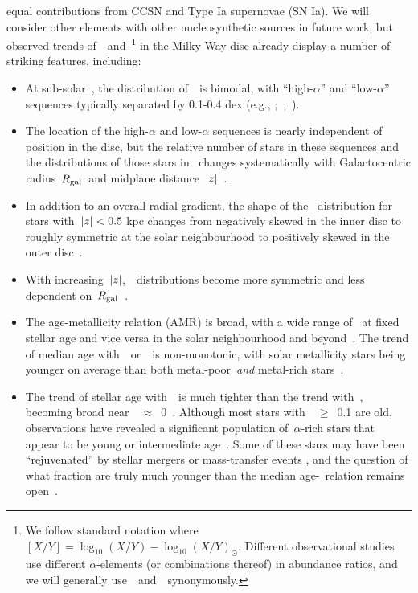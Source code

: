 equal contributions from CCSN and Type Ia supernovae (SN Ia). We will consider 
other elements with other nucleosynthetic sources in future work, but 
observed trends of~\feh~and~\afe\footnote{
	We follow standard notation where $[X/Y] = \log_{10}(X/Y) - 
	\log_{10}(X/Y)_\odot$. Different observational studies use different 
	$\alpha$-elements (or combinations thereof) in abundance ratios, and we 
	will generally use~\ofe~and~\afe~synonymously. 
} in the Milky Way disc already display a number of striking features, 
including: 
\begin{itemize} 
	\item At sub-solar~\feh, the distribution of~\afe~is bimodal, with 
	``high-$\alpha$'' and ``low-$\alpha$'' sequences typically separated by 
	0.1-0.4 dex (e.g., 
	\citealp{Fuhrmann1998};~\citealp*{Bensby2003};~\citealp{Adibekyan2012, 
	Vincenzo2021a}). 

	\item The location of the high-$\alpha$ and low-$\alpha$ sequences is 
	nearly independent of position in the disc, but the relative number of 
	stars in these sequences and the distributions of those stars in 
    \feh~changes systematically with Galactocentric radius~$R_\text{gal}$~and midplane 
	distance~$\left|z\right|$~\citep{Nidever2014, Hayden2015, Weinberg2019}. 

	\item In addition to an overall radial gradient, the shape of the 
	\feh~distribution for stars with~$\left|z\right| < 0.5$ kpc changes from negatively 
	skewed in the inner disc to roughly symmetric at the solar neighbourhood 
	to positively skewed in the outer disc~\citep{Hayden2015, Weinberg2019}. 

	\item With increasing~$\left|z\right|$,~\feh~distributions become more symmetric 
	and less dependent on~$R_\text{gal}$~\citep{Hayden2015}. 

	\item The age-metallicity relation (AMR) is broad, with a wide range of 
	\feh~at fixed stellar age and vice versa in the solar neighbourhood 
	\citep{Edvardsson1993} and beyond~\citep{Feuillet2019}. The trend of 
	median age with~\feh~or~\oh~is non-monotonic, with solar metallicity 
	stars being younger on average than both metal-poor~\textit{and} 
	metal-rich stars~\citep{Feuillet2018, Feuillet2019, Lu2022}. 

	\item The trend of stellar age with~\afe~is much tighter than the trend 
	with~\feh, becoming broad near~\afe~$\approx$~0~\citep{Feuillet2018, 
	Feuillet2019}. Although most stars with~\afe~$\geq$~0.1 are old, 
	observations have revealed a significant population of~$\alpha$-rich stars 
	that appear to be young or intermediate age~\citep{Chiappini2015, 
	Martig2015, Martig2016, Warfield2021}. Some of these stars may have been 
	``rejuvenated'' by stellar mergers or mass-transfer events 
	\citep{Jofre2016, Yong2016, Izzard2018, SilvaAguirre2018}, and 
	the question of what fraction are truly much younger than the median 
	age-\afe~relation remains open~\citep{Hekker2019, Miglio2021}. 
\end{itemize} 
